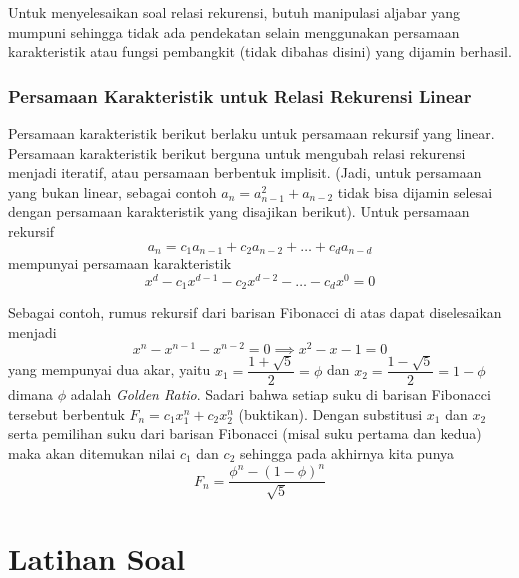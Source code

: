 \documentclass[11pt]{scrartcl}
\begin{document}
     Untuk menyelesaikan soal relasi rekurensi, butuh manipulasi aljabar yang mumpuni sehingga tidak ada pendekatan selain menggunakan persamaan karakteristik atau fungsi pembangkit (tidak dibahas disini) yang dijamin berhasil.
     
     \subsubsection{Persamaan Karakteristik untuk Relasi Rekurensi Linear}
     Persamaan karakteristik berikut berlaku untuk persamaan rekursif yang linear. Persamaan karakteristik berikut berguna untuk mengubah relasi rekurensi menjadi iteratif, atau persamaan berbentuk implisit. (Jadi, untuk persamaan yang bukan linear, sebagai contoh $a_n = a_{n-1}^2 + a_{n-2}$ tidak bisa dijamin selesai dengan persamaan karakteristik yang disajikan berikut).
     Untuk persamaan rekursif
     $$a_n = c_1a_{n-1}+c_2a_{n-2}+\dots+c_da_{n-d}$$
     mempunyai persamaan karakteristik
     $$x^d-c_1x^{d-1}-c_2x^{d-2}-\dots-c_dx^0=0$$
     
     Sebagai contoh, rumus rekursif dari barisan Fibonacci di atas dapat diselesaikan menjadi 
     $$x^{n}-x^{n-1}-x^{n-2}=0 \implies x^2-x-1=0$$
     yang mempunyai dua akar, yaitu $x_1 = \dfrac{1+\sqrt{5}}{2}=\phi$ dan $x_2 = \dfrac{1-\sqrt{5}}{2}=1-\phi$ dimana $\phi$ adalah \textit{Golden Ratio}. Sadari bahwa setiap suku di barisan Fibonacci tersebut berbentuk $F_n = c_1x_1^n + c_2x_2^n$ (buktikan). Dengan substitusi $x_1$ dan $x_2$ serta pemilihan suku dari barisan Fibonacci (misal suku pertama dan kedua) maka akan ditemukan nilai $c_1$ dan $c_2$ sehingga pada akhirnya kita punya
     $$F_n=\dfrac{\phi^n-(1-\phi)^n}{\sqrt{5}}$$
        
    \section{Latihan Soal}
\end{document}
